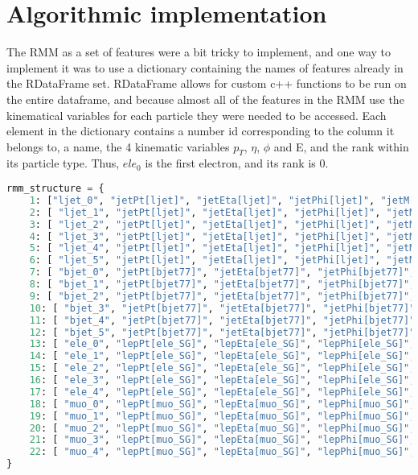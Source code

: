 \section{Algorithmic implementation}

The RMM as a set of features were a bit tricky to implement, and one way to implement it was 
to use a dictionary containing the names of features already in the RDataFrame set. RDataFrame 
allows for custom c++ functions to be run on the entire dataframe, and because almost all of 
the features in the RMM use the kinematical variables for each particle they were needed to 
be accessed. Each element in the dictionary contains a number id corresponding to the column 
it belongs to, a name, the 4 kinematic variables $p_T$, $\eta$, $\phi$ and E, and the rank 
within its particle type. Thus, $ele_0$ is the first electron, and its rank is 0. 

\begin{lstlisting}[language=Python, style=pythonstyle, label={code:rmm_dict_struct}]
rmm_structure = {
    1: ["ljet_0", "jetPt[ljet]", "jetEta[ljet]", "jetPhi[ljet]", "jetM[ljet]", 0,],
    2: [ "ljet_1", "jetPt[ljet]", "jetEta[ljet]", "jetPhi[ljet]", "jetM[ljet]", 1,],
    3: [ "ljet_2", "jetPt[ljet]", "jetEta[ljet]", "jetPhi[ljet]", "jetM[ljet]", 2,],
    4: [ "ljet_3", "jetPt[ljet]", "jetEta[ljet]", "jetPhi[ljet]", "jetM[ljet]", 3,],
    5: [ "ljet_4", "jetPt[ljet]", "jetEta[ljet]", "jetPhi[ljet]", "jetM[ljet]", 4,],
    6: [ "ljet_5", "jetPt[ljet]", "jetEta[ljet]", "jetPhi[ljet]", "jetM[ljet]", 5,],
    7: [ "bjet_0", "jetPt[bjet77]", "jetEta[bjet77]", "jetPhi[bjet77]", "jetM[bjet77]", 0,],
    8: [ "bjet_1", "jetPt[bjet77]", "jetEta[bjet77]", "jetPhi[bjet77]", "jetM[bjet77]", 1,],
    9: [ "bjet_2", "jetPt[bjet77]", "jetEta[bjet77]", "jetPhi[bjet77]", "jetM[bjet77]", 2,],
    10: [ "bjet_3", "jetPt[bjet77]", "jetEta[bjet77]", "jetPhi[bjet77]", "jetM[bjet77]", 3,],
    11: [ "bjet_4", "jetPt[bjet77]", "jetEta[bjet77]", "jetPhi[bjet77]", "jetM[bjet77]", 4,],
    12: [ "bjet_5", "jetPt[bjet77]", "jetEta[bjet77]", "jetPhi[bjet77]", "jetM[bjet77]", 5,],
    13: [ "ele_0", "lepPt[ele_SG]", "lepEta[ele_SG]", "lepPhi[ele_SG]", "lepM[ele_SG]", 0,],
    14: [ "ele_1", "lepPt[ele_SG]", "lepEta[ele_SG]", "lepPhi[ele_SG]", "lepM[ele_SG]", 1,],
    15: [ "ele_2", "lepPt[ele_SG]", "lepEta[ele_SG]", "lepPhi[ele_SG]", "lepM[ele_SG]", 2,],
    16: [ "ele_3", "lepPt[ele_SG]", "lepEta[ele_SG]", "lepPhi[ele_SG]", "lepM[ele_SG]", 3,],
    17: [ "ele_4", "lepPt[ele_SG]", "lepEta[ele_SG]", "lepPhi[ele_SG]", "lepM[ele_SG]", 4,],
    18: [ "muo_0", "lepPt[muo_SG]", "lepEta[muo_SG]", "lepPhi[muo_SG]", "lepM[muo_SG]", 0,],
    19: [ "muo_1", "lepPt[muo_SG]", "lepEta[muo_SG]", "lepPhi[muo_SG]", "lepM[muo_SG]", 1,],
    20: [ "muo_2", "lepPt[muo_SG]", "lepEta[muo_SG]", "lepPhi[muo_SG]", "lepM[muo_SG]", 2,],
    21: [ "muo_3", "lepPt[muo_SG]", "lepEta[muo_SG]", "lepPhi[muo_SG]", "lepM[muo_SG]", 3,],
    22: [ "muo_4", "lepPt[muo_SG]", "lepEta[muo_SG]", "lepPhi[muo_SG]", "lepM[muo_SG]", 4,],
}      

\end{lstlisting}
 
